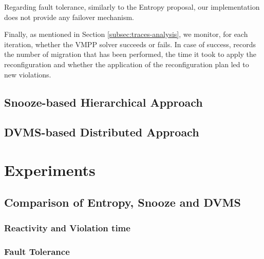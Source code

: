 Regarding fault tolerance, similarly to the Entropy proposal, our
implementation does not provide any failover mechanism.

Finally, as mentioned in Section \ref{subsec:traces-analysis}, we monitor, for each iteration,
whether the VMPP solver succeeds or fails. In case of success, \vmps
records the number of migration that has been performed, the time it
took to apply the reconfiguration and whether
the application of the reconfiguration plan led to new violations.

\subsection{Snooze-based Hierarchical Approach}
\label{subsec:snooze}


\subsection{DVMS-based Distributed Approach}
\label{subsec:dvms}

\section{Experiments}
\label{sec:experiments}
\subsection{Comparison of Entropy, Snooze and DVMS}

\subsubsection{Reactivity and Violation time}

\subsubsection{Fault Tolerance}
\MS[JP]{}



